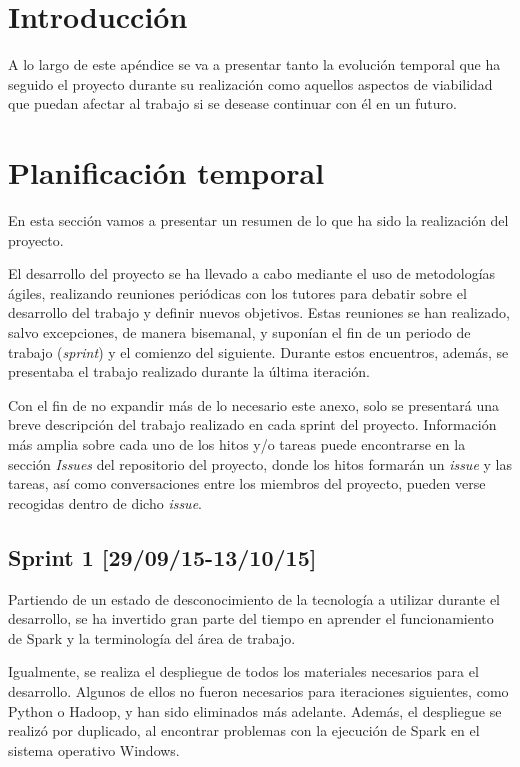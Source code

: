 
\section{Introducción}

A lo largo de este apéndice se va a presentar tanto la evolución temporal que ha seguido el proyecto durante su realización como aquellos aspectos de viabilidad que puedan afectar al trabajo si se desease continuar con él en un futuro.

\section{Planificación temporal}

En esta sección vamos a presentar un resumen de lo que ha sido la realización del proyecto. 

El desarrollo del proyecto se ha llevado a cabo mediante el uso de metodologías ágiles, realizando reuniones periódicas con los tutores para debatir sobre el desarrollo del trabajo y definir nuevos objetivos. Estas reuniones se han realizado, salvo excepciones, de manera bisemanal, y suponían el fin de un periodo de trabajo (\textit{sprint}) y el comienzo del siguiente. Durante estos encuentros, además, se presentaba el trabajo realizado durante la última iteración.

Con el fin de no expandir más de lo necesario este anexo, solo se presentará una breve descripción del trabajo realizado en cada sprint del proyecto. Información más amplia sobre cada uno de los hitos y/o tareas puede encontrarse en la sección \textit{Issues} del repositorio del proyecto, donde los hitos formarán un \textit{issue} y las tareas, así como conversaciones entre los miembros del proyecto, pueden verse recogidas dentro de dicho \textit{issue}.

\subsection{Sprint 1 [29/09/15-13/10/15]}

Partiendo de un estado de desconocimiento de la tecnología a utilizar durante el desarrollo, se ha invertido gran parte del tiempo en aprender el funcionamiento de Spark y la terminología del área de trabajo.

Igualmente, se realiza el despliegue de todos los materiales necesarios para el desarrollo. Algunos de ellos no fueron necesarios para iteraciones siguientes, como Python o Hadoop, y han sido eliminados más adelante. Además, el despliegue se realizó por duplicado, al encontrar problemas con la ejecución de Spark en el sistema operativo Windows.

